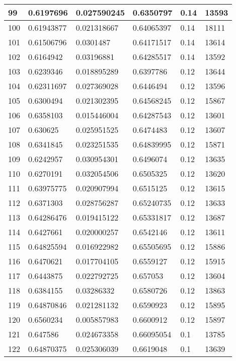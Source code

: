 \begin{longtable}{|l|l|l|l|l|l|}
99 & 0.6197696 & 0.027590245 & 0.6350797 & 0.14 & 13593 \\ \hline 
100 & 0.61943877 & 0.021318667 & 0.64065397 & 0.14 & 18111 \\ \hline 
101 & 0.61506796 & 0.0301487 & 0.64171517 & 0.14 & 13614 \\ \hline 
102 & 0.6164942 & 0.03196881 & 0.64285517 & 0.14 & 13592 \\ \hline 
103 & 0.6239346 & 0.018895289 & 0.6397786 & 0.12 & 13644 \\ \hline 
104 & 0.62311697 & 0.027369028 & 0.6446494 & 0.12 & 13596 \\ \hline 
105 & 0.6300494 & 0.021302395 & 0.64568245 & 0.12 & 15867 \\ \hline 
106 & 0.6358103 & 0.015446004 & 0.64287543 & 0.12 & 13601 \\ \hline 
107 & 0.630625 & 0.025951525 & 0.6474483 & 0.12 & 13607 \\ \hline 
108 & 0.6341845 & 0.023251535 & 0.64839995 & 0.12 & 15871 \\ \hline 
109 & 0.6242957 & 0.030954301 & 0.6496074 & 0.12 & 13635 \\ \hline 
110 & 0.6270191 & 0.032054506 & 0.6505325 & 0.12 & 13620 \\ \hline 
111 & 0.63975775 & 0.020907994 & 0.6515125 & 0.12 & 13615 \\ \hline 
112 & 0.6371303 & 0.028756287 & 0.65240735 & 0.12 & 13633 \\ \hline 
113 & 0.64286476 & 0.019415122 & 0.65331817 & 0.12 & 13687 \\ \hline 
114 & 0.6427661 & 0.020000257 & 0.6542146 & 0.12 & 13611 \\ \hline 
115 & 0.64825594 & 0.016922982 & 0.65505695 & 0.12 & 15886 \\ \hline 
116 & 0.6470621 & 0.017704105 & 0.6559127 & 0.12 & 15915 \\ \hline 
117 & 0.6443875 & 0.022792725 & 0.657053 & 0.12 & 13604 \\ \hline 
118 & 0.6384155 & 0.03286332 & 0.6580726 & 0.12 & 13863 \\ \hline 
119 & 0.64870846 & 0.021281132 & 0.6590923 & 0.12 & 15895 \\ \hline 
120 & 0.6560234 & 0.005857983 & 0.6600912 & 0.12 & 15897 \\ \hline 
121 & 0.647586 & 0.024673358 & 0.66095054 & 0.1 & 13785 \\ \hline 
122 & 0.64870375 & 0.025306039 & 0.6619048 & 0.1 & 13639 \\ \hline 

\end{longtable}
